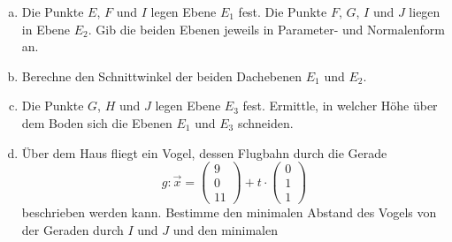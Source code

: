\begin{exercise}
\begin{center}
    \end{center}
    \begin{enumerate}[a)]
      \item Die Punkte $E$, $F$ und $I$ legen Ebene $E_{1}$ fest.
            Die Punkte $F$, $G$, $I$ und $J$ liegen in Ebene $E_{2}$.
            Gib die beiden Ebenen jeweils in Parameter- und Normalenform an.
      \item Berechne den Schnittwinkel der beiden Dachebenen $E_{1}$ und $E_{2}$.
      \item Die Punkte $G$, $H$ und $J$ legen Ebene $E_{3}$ fest.
            Ermittle, in welcher Höhe über dem Boden sich die Ebenen
            $E_{1}$ und $E_{3}$ schneiden.
      \item Über dem Haus fliegt ein Vogel, dessen Flugbahn durch die Gerade
            \begin{equation*}
              g:\vec{x}=
              \begin{pmatrix} 9 \\ 0 \\ 11 \end{pmatrix}
              +t\cdot
              \begin{pmatrix} 0 \\ 1 \\ 1 \end{pmatrix}
            \end{equation*}
            beschrieben werden kann. Bestimme den minimalen Abstand des
            Vogels von der Geraden durch $I$ und $J$ und den minimalen

\end{enumerate}
\end{exercise}
